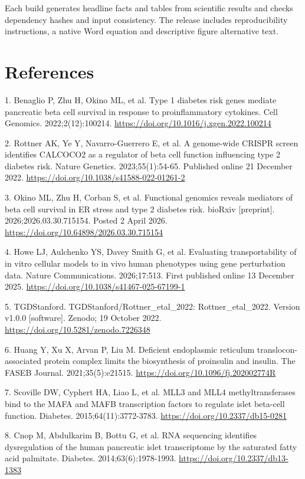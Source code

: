 \documentclass[10pt,letterpaper]{article}
\begin{document}
Each build generates headline facts and tables from scientific results and checks dependency hashes and input consistency. The release includes reproducibility instructions, a native Word equation and descriptive figure alternative text.

\clearpage
\section*{References}
{\small 1. Benaglio P, Zhu H, Okino ML, et al. Type 1 diabetes risk genes mediate pancreatic beta cell survival in response to proinflammatory cytokines. Cell Genomics. 2022;2(12):100214. \url{https://doi.org/10.1016/j.xgen.2022.100214}}

{\small 2. Rottner AK, Ye Y, Navarro-Guerrero E, et al. A genome-wide CRISPR screen identifies CALCOCO2 as a regulator of beta cell function influencing type 2 diabetes risk. Nature Genetics. 2023;55(1):54-65. Published online 21 December 2022. \url{https://doi.org/10.1038/s41588-022-01261-2}}

{\small 3. Okino ML, Zhu H, Corban S, et al. Functional genomics reveals mediators of beta cell survival in ER stress and type 2 diabetes risk. bioRxiv [preprint]. 2026;2026.03.30.715154. Posted 2 April 2026. \url{https://doi.org/10.64898/2026.03.30.715154}}

{\small 4. Howe LJ, Aulchenko YS, Davey Smith G, et al. Evaluating transportability of in vitro cellular models to in vivo human phenotypes using gene perturbation data. Nature Communications. 2026;17:513. First published online 13 December 2025. \url{https://doi.org/10.1038/s41467-025-67199-1}}

{\small 5. TGDStanford. TGDStanford/Rottner\_etal\_2022: Rottner\_etal\_2022. Version v1.0.0 [software]. Zenodo; 19 October 2022. \url{https://doi.org/10.5281/zenodo.7226348}}

{\small 6. Huang Y, Xu X, Arvan P, Liu M. Deficient endoplasmic reticulum translocon-associated protein complex limits the biosynthesis of proinsulin and insulin. The FASEB Journal. 2021;35(5):e21515. \url{https://doi.org/10.1096/fj.202002774R}}

{\small 7. Scoville DW, Cyphert HA, Liao L, et al. MLL3 and MLL4 methyltransferases bind to the MAFA and MAFB transcription factors to regulate islet beta-cell function. Diabetes. 2015;64(11):3772-3783. \url{https://doi.org/10.2337/db15-0281}}

{\small 8. Cnop M, Abdulkarim B, Bottu G, et al. RNA sequencing identifies dysregulation of the human pancreatic islet transcriptome by the saturated fatty acid palmitate. Diabetes. 2014;63(6):1978-1993. \url{https://doi.org/10.2337/db13-1383}}
\end{document}
